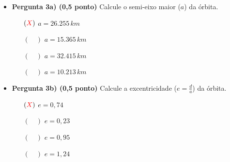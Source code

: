 \documentclass[a4paper, 12pt]{article}
\newcommand{\red}[1]{\textcolor{red}{#1}}
\begin{document}
\begin{flushleft}
\begin{itemize}
\begin{figure}[H]
                \end{figure}
                \begin{itemize}
                    \item \textbf{Pergunta 3a) (0,5 ponto)} Calcule o semi-eixo maior ($a$) da órbita.
                        \begin{itemize}
                            \item[$(\red{X})$] $a = 26.255 \, km$
                            \item[$(\quad)$] $a = 15.365 \, km$
                            \item[$(\quad)$] $a = 32.415 \, km$
                            \item[$(\quad)$] $a = 10.213 \, km$
                        \end{itemize}
                    \item \textbf{Pergunta 3b) (0,5 ponto)} Calcule a excentricidade  ($e= \frac{d}{a}$) da órbita.
                        \begin{itemize}
                            \item[$(\red{X})$] $e = 0,74$
                            \item[$(\quad)$] $e = 0,23$
                            \item[$(\quad)$] $e = 0,95$
                            \item[$(\quad)$] $e = 1,24$
                        \end{itemize}
                \end{itemize}


\end{itemize}
\end{flushleft}
\end{document}
